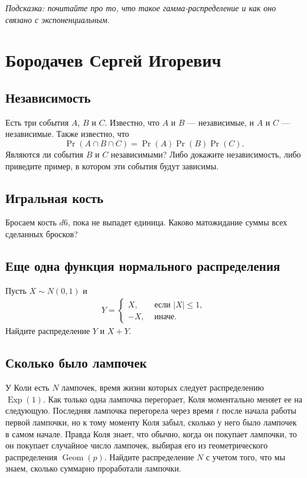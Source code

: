 \documentclass[12pt]{article}
\DeclareMathOperator{\Geom}{Geom}
\DeclareMathOperator{\Exp}{Exp}
\begin{document}
\emph{Подсказка: почитайте про то, что такое гамма-распределение и как оно связано с экспоненциальным.}

\newpage
\section{Бородачев Сергей Игоревич}

\subsection{Независимость}
Есть три события $A$, $B$ и $C$. Известно, что $A$ и $B$ --- независимые, и $A$ и $C$ --- независимые. Также известно, что \[\Pr(A \cap B \cap C) = \Pr(A)\Pr(B)\Pr(C).\] Являются ли события $B$ и $C$ независимыми? Либо докажите независимость, либо приведите пример, в котором эти события будут зависимы.

\subsection{Игральная кость}Бросаем кость $d6$, пока не выпадет единица. Каково матожидание суммы всех сделанных бросков?

\subsection{Еще одна функция нормального распределения}
Пусть $X \sim N(0, 1)$ и 
\begin{align*}
    Y = \begin{cases}
        X, &\text{ если } |X| \le 1, \\
        -X, &\text{ иначе.}
    \end{cases}
\end{align*}
Найдите распределение $Y$ и $X + Y$.

\subsection{Сколько было лампочек}
У Коли есть $N$ лампочек, время жизни которых следует распределению $\Exp(1)$. Как только одна лампочка перегорает, Коля моментально меняет ее на следующую. Последняя лампочка перегорела через время $t$ после начала работы первой лампочки, но к тому моменту Коля забыл, сколько у него было лампочек в самом начале. Правда Коля знает, что обычно, когда он покупает лампочки, то он покупает случайное число лампочек, выбирая его из геометрического распределения $\Geom(p)$. Найдите распределение $N$ с учетом того, что мы знаем, сколько суммарно проработали лампочки. 
\end{document}
